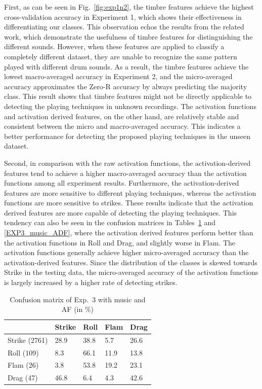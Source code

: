 \documentclass{article}
\begin{document}
First,  as can be seen in Fig.~\ref{fig:exp1n2}, the timbre features achieve the highest cross-validation accuracy in Experiment 1, which shows their effectiveness in differentiating our classes. This observation echos the results from the related work, which demonstrate the usefulness of timbre features for distinguishing the different sounds. However, when these features are applied to classify a completely different dataset, they are unable to recognize the same pattern played with different drum sounds. As a result, the timbre features achieve the lowest macro-averaged accuracy in Experiment 2, and the micro-averaged accuracy approximates the Zero-R accuracy by always predicting the majority class. 
This result shows that timbre features might not be directly applicable to detecting the playing techniques in unknown recordings. The activation functions and activation derived features, on the other hand, are relatively stable and consistent between the micro and macro-averaged accuracy. This indicates a better performance for detecting the proposed playing techniques in the unseen dataset. 

Second, in comparison with the raw activation functions, the activation-derived features tend to achieve a higher macro-averaged accuracy than the activation functions among all experiment results. Furthermore, the activation-derived features are more sensitive to different playing techniques, whereas the activation functions are more sensitive to strikes. 
These results indicate that the activation derived features are more capable of detecting the playing techniques. This tendency can also be seen in the confusion matrices in Tables~\ref{EXP3_music_AF} and \ref{EXP3_music_ADF}, where the activation derived features perform better than the activation functions in Roll and Drag, and slightly worse in Flam. The activation functions generally achieve higher micro-averaged accuracy than the activation-derived features. Since the distribution of the classes is skewed towards Strike in the testing data, the micro-averaged accuracy of the activation functions is largely increased by a higher rate of detecting strikes.

\begin{table}[]
\centering
\begin{tabular}{l|llll}
       & Strike & Roll & Flam & Drag \\ \hline
Strike (2761) & 28.9   & 38.8 & 5.7  & 26.6 \\
Roll (109)  & 8.3    & 66.1 & 11.9 & 13.8 \\
Flam (26)  & 3.8    & 53.8 & 19.2 & 23.1 \\
Drag (47)  & 46.8   & 6.4  & 4.3  & 42.6
\end{tabular}
\caption{Confusion matrix of Exp.~3 with music and AF (in \%)}
\label{EXP3_music_AF}
\end{table}
\end{document}
